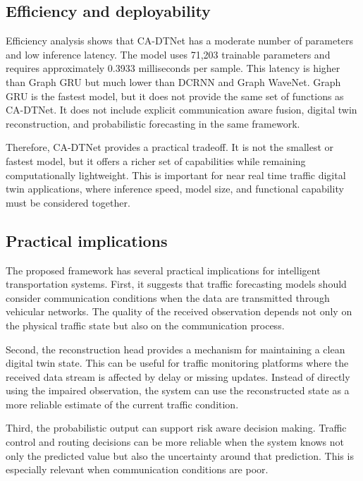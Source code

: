 \documentclass[pdflatex,sn-mathphys-num]{sn-jnl}%
\theoremstyle{thmstyleone}%
\theoremstyle{thmstyletwo}%
\theoremstyle{thmstylethree}%
\begin{document}
\subsection{Efficiency and deployability}
\label{subsec:discussion_efficiency}

Efficiency analysis shows that CA-DTNet has a moderate number of parameters and low inference latency. The model uses 71,203 trainable parameters and requires approximately 0.3933 milliseconds per sample. This latency is higher than Graph GRU but much lower than DCRNN and Graph WaveNet. Graph GRU is the fastest model, but it does not provide the same set of functions as CA-DTNet. It does not include explicit communication aware fusion, digital twin reconstruction, and probabilistic forecasting in the same framework.

Therefore, CA-DTNet provides a practical tradeoff. It is not the smallest or fastest model, but it offers a richer set of capabilities while remaining computationally lightweight. This is important for near real time traffic digital twin applications, where inference speed, model size, and functional capability must be considered together.

\subsection{Practical implications}
\label{subsec:discussion_practical_implications}

The proposed framework has several practical implications for intelligent transportation systems. First, it suggests that traffic forecasting models should consider communication conditions when the data are transmitted through vehicular networks. The quality of the received observation depends not only on the physical traffic state but also on the communication process.

Second, the reconstruction head provides a mechanism for maintaining a clean digital twin state. This can be useful for traffic monitoring platforms where the received data stream is affected by delay or missing updates. Instead of directly using the impaired observation, the system can use the reconstructed state as a more reliable estimate of the current traffic condition.

Third, the probabilistic output can support risk aware decision making. Traffic control and routing decisions can be more reliable when the system knows not only the predicted value but also the uncertainty around that prediction. This is especially relevant when communication conditions are poor.
\end{document}
